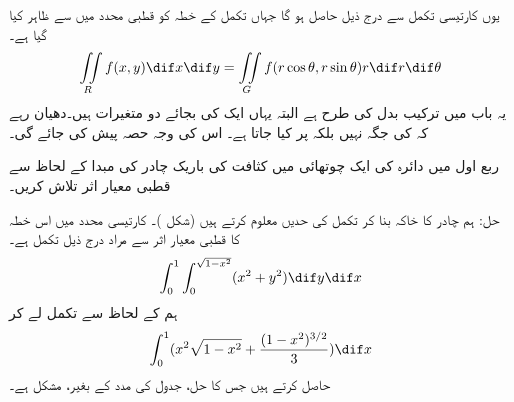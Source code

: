 یوں کارتیسی تکمل سے درج ذیل حاصل ہو گا جہاں تکمل کے خطہ کو قطبی محدد میں  سے ظاہر کیا گیا ہے۔
\begin{align}\label{مساوات_بالکثرت_قطبی_محدد_میں_رقبہ_کی_عمومی}
\iint\limits_R f(x,y)\dif x\dif y=\iint\limits_G f(r\cos\theta,r\sin\theta)r\dif r\dif \theta
\end{align}
یہ  باب  میں ترکیب بدل کی طرح ہے البتہ یہاں ایک کی بجائے دو متغیرات ہیں۔دھیان رہے کہ  کی جگہ  نہیں بلکہ  پر کیا جاتا ہے۔ اس کی وجہ حصہ   پیش کی جائے گی۔

ربع اول میں دائرہ  کی ایک چوتھائی   میں کثافت  کی باریک چادر کی مبدا کے لحاظ سے  قطبی  معیار اثر تلاش کریں۔

حل:\quad
ہم چادر  کا خاکہ بنا کر تکمل کی حدیں معلوم کرتے ہیں (شکل )۔ کارتیسی محدد میں اس خطہ  کا قطبی معیار اثر سے مراد درج ذیل تکمل ہے۔
\begin{align*}
\int_0^1\int_0^{\sqrt{1-x^2}}(x^2+y^2)\dif y\dif x
\end{align*}
ہم   کے لحاظ سے تکمل لے  کر
\begin{align*}
\int_0^1 (x^2\sqrt{1-x^2}+\frac{(1-x^2)^{3/2}}{3})\dif x
\end{align*}
حاصل کرتے ہیں جس کا حل، جدول کی مدد کے بغیر، مشکل ہے۔

